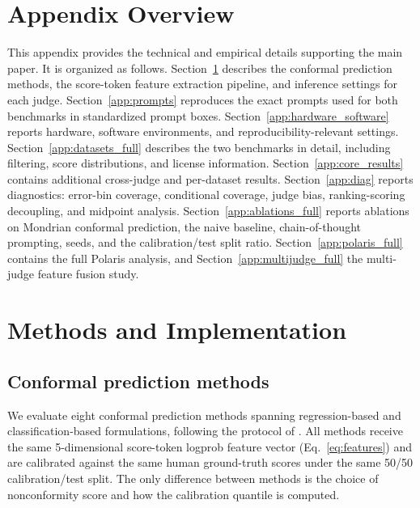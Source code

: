 \documentclass{article}
\begin{document}



\appendix

\section*{Appendix Overview}

This appendix provides the technical and empirical details supporting the main paper. It is organized as follows. Section~\ref{app:methods} describes the conformal prediction methods, the score-token feature extraction pipeline, and inference settings for each judge. Section~\ref{app:prompts} reproduces the exact prompts used for both benchmarks in standardized prompt boxes. Section~\ref{app:hardware_software} reports hardware, software environments, and reproducibility-relevant settings. Section~\ref{app:datasets_full} describes the two benchmarks in detail, including filtering, score distributions, and license information. Section~\ref{app:core_results} contains additional cross-judge and per-dataset results. Section~\ref{app:diag} reports diagnostics: error-bin coverage, conditional coverage, judge bias, ranking-scoring decoupling, and midpoint analysis. Section~\ref{app:ablations_full} reports ablations on Mondrian conformal prediction, the naive baseline, chain-of-thought prompting, seeds, and the calibration/test split ratio. Section~\ref{app:polaris_full} contains the full Polaris analysis, and Section~\ref{app:multijudge_full} the multi-judge feature fusion study.

\section{Methods and Implementation}
\label{app:methods}

\subsection{Conformal prediction methods}
\label{sec:appendix_cp_methods}

We evaluate eight conformal prediction methods spanning regression-based and classification-based formulations, following the protocol of \citet{sheng2025analyzing}. All methods receive the same 5-dimensional score-token logprob feature vector (Eq.~\ref{eq:features}) and are calibrated against the same human ground-truth scores under the same 50/50 calibration/test split. The only difference between methods is the choice of nonconformity score and how the calibration quantile is computed.
\end{document}
